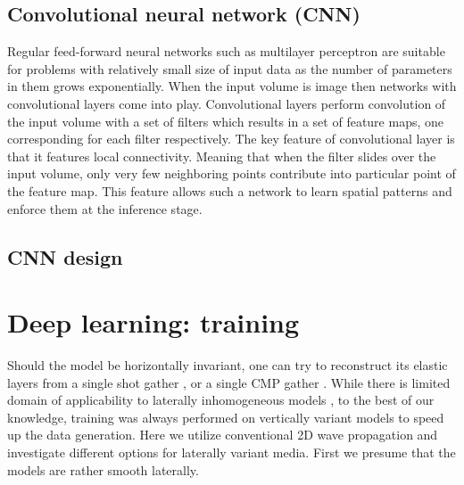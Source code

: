 \documentclass[manuscript]{geophysics}
\begin{document}
\subsection{Convolutional neural network (CNN)}
Regular feed-forward neural networks such as multilayer perceptron are suitable for problems with relatively small size of input data as the number of parameters in them grows exponentially. When the input volume is image then networks with convolutional layers come into play. Convolutional layers perform convolution of the input volume with a set of filters which results in a set of feature maps, one corresponding for each filter respectively. The key feature of convolutional layer is that it features local connectivity. Meaning that when the filter slides over the input volume, only very few neighboring points contribute into particular point of the feature map. This feature allows such a network to learn spatial patterns and enforce them at the inference stage.



\subsection{CNN design}




%







\section{Deep learning: training}
Should the model be horizontally invariant, one can try to reconstruct its elastic layers from a single shot gather \citep{roth1994}, or a single CMP gather \citep{york2019}.
While there is limited domain of applicability to laterally inhomogeneous models \citep{york2019}, to the best of our knowledge, training was always performed on vertically variant models to speed up the data generation. Here we utilize conventional 2D wave propagation and investigate different options for laterally variant media. First we presume that the models are rather smooth laterally.
\end{document}
